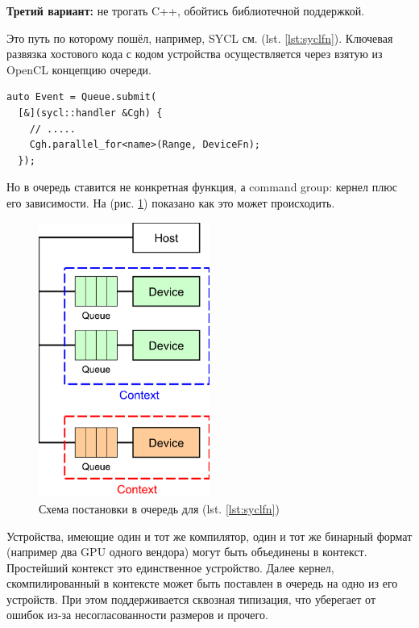 \documentclass[a4paper,12pt,oneside]{article}
\begin{document}
\textbf{Третий вариант:} не трогать C++, обойтись библиотечной поддержкой.

Это путь по которому пошёл, например, SYCL см. (lst. \ref{lst:syclfn}).
Ключевая развязка хостового кода с кодом устройства осуществляется через взятую из OpenCL концепцию очереди.

\begin{lstlisting}[caption={Выполнение DeviceFn, SYCL},label={lst:syclfn}]
auto Event = Queue.submit(
  [&](sycl::handler &Cgh) {
    // .....
    Cgh.parallel_for<name>(Range, DeviceFn);
  });
\end{lstlisting}

Но в очередь ставится не конкретная функция, а command group: кернел плюс его зависимости. На (рис. \ref{fig:syclfn}) показано как это может происходить.

\begin{figure}
\centering
\includegraphics[width=0.5\textwidth]{pictures/hetero-prog-queue.pdf}
\caption{Схема постановки в очередь для (lst. \ref{lst:syclfn})}
\label{fig:syclfn}
\end{figure}

Устройства, имеющие один и тот же компилятор, один и тот же бинарный формат (например два GPU одного вендора) могут быть объединены в контекст. Простейший контекст это единственное устройство. Далее кернел, скомпилированный в контексте может быть поставлен в очередь на одно из его устройств.
При этом поддерживается сквозная типизация, что уберегает от ошибок из-за несогласованности размеров и прочего.
\end{document}
